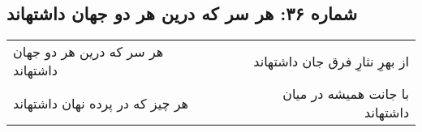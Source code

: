 \begin{center}
\section*{شماره ۳۶: هر سر که درین هر دو جهان داشتهاند}
\label{sec:036}
\begin{longtable}{l p{0.5cm} r}
هر سر که درین هر دو جهان داشتهاند
&&
از بهرِ نثارِ فرق جان داشتهاند
\\
هر چیز که در پرده نهان داشتهاند
&&
با جانت همیشه در میان داشتهاند
\\
\end{longtable}
\end{center}
